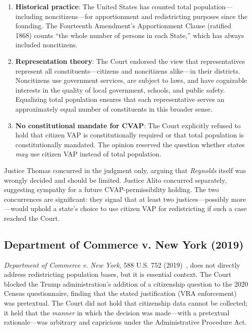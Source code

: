 \begin{enumerate}
    \item \textbf{Historical practice}: The United States has counted total population---including noncitizens---for apportionment and redistricting purposes since the founding. The Fourteenth Amendment's Apportionment Clause (ratified 1868) counts ``the whole number of persons in each State,'' which has always included noncitizens.

    \item \textbf{Representation theory}: The Court endorsed the view that representatives represent all constituents---citizens and noncitizens alike---in their districts. Noncitizens use government services, are subject to laws, and have cognizable interests in the quality of local government, schools, and public safety. Equalizing total population ensures that each representative serves an approximately equal number of constituents in this broader sense.

    \item \textbf{No constitutional mandate for CVAP}: The Court explicitly refused to hold that citizen VAP is constitutionally required or that total population is constitutionally mandated. The opinion reserved the question whether states \emph{may} use citizen VAP instead of total population.
\end{enumerate}

Justice Thomas concurred in the judgment only, arguing that \emph{Reynolds} itself was wrongly decided and should be limited. Justice Alito concurred separately, suggesting sympathy for a future CVAP-permissibility holding. The two concurrences are significant: they signal that at least two justices---possibly more---would uphold a state's choice to use citizen VAP for redistricting if such a case reached the Court.

\subsection{Department of Commerce v. New York (2019)}

\emph{Department of Commerce v. New York}, 588 U.S. 752 (2019)~\citep{deptcommerce2019}, does not directly address redistricting population bases, but it is essential context. The Court blocked the Trump administration's addition of a citizenship question to the 2020 Census questionnaire, finding that the stated justification (VRA enforcement) was pretextual. The Court did not hold that citizenship data cannot be collected; it held that the \emph{manner} in which the decision was made---with a pretextual rationale---was arbitrary and capricious under the Administrative Procedure Act.

